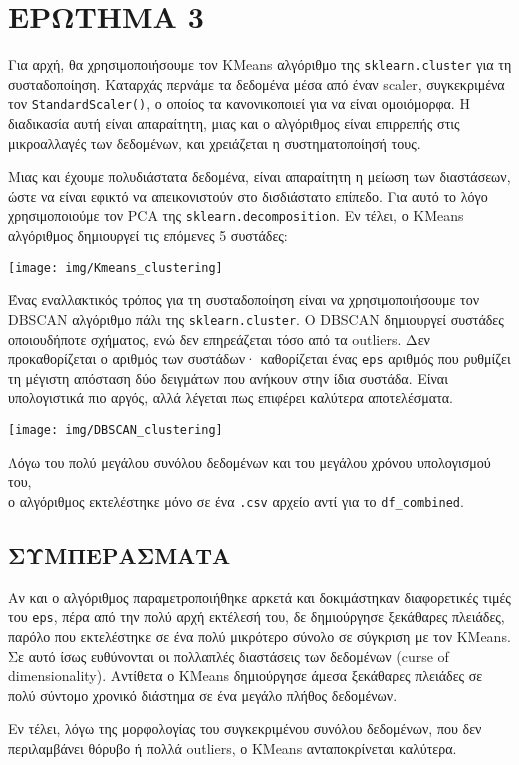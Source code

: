 \pagebreak
\chapter{ΕΡΩΤΗΜΑ 3}

    Για αρχή, θα χρησιμοποιήσουμε τον KMeans αλγόριθμο της \texttt{sklearn.cluster} για τη συσταδοποίηση.
    Καταρχάς περνάμε τα δεδομένα μέσα από έναν scaler, συγκεκριμένα τον \texttt{StandardScaler()}, ο οποίος τα κανονικοποιεί για να είναι ομοιόμορφα.
    Η διαδικασία αυτή είναι απαραίτητη, μιας και ο αλγόριθμος είναι επιρρεπής στις μικροαλλαγές των δεδομένων, και χρειάζεται η συστηματοποίησή τους.

    Μιας και έχουμε πολυδιάστατα δεδομένα, είναι απαραίτητη η μείωση των διαστάσεων, ώστε να είναι εφικτό να απεικονιστούν στο δισδιάστατο επίπεδο.
    Για αυτό το λόγο χρησιμοποιούμε τον PCA της \texttt{sklearn.decomposition}. Εν τέλει, ο KMeans αλγόριθμος δημιουργεί τις επόμενες 5 συστάδες:

    \begin{center}
        \texttt{[image: img/Kmeans\_clustering]}
    \end{center}

    Ένας εναλλακτικός τρόπος για τη συσταδοποίηση είναι να χρησιμοποιήσουμε τον DBSCAN αλγόριθμο πάλι της \texttt{sklearn.cluster}.
    Ο DBSCAN δημιουργεί συστάδες οποιουδήποτε σχήματος, ενώ δεν επηρεάζεται τόσο από τα outliers.
    Δεν προκαθορίζεται ο αριθμός των συστάδων· καθορίζεται ένας \texttt{eps} αριθμός που ρυθμίζει τη μέγιστη απόσταση δύο δειγμάτων που ανήκουν στην ίδια συστάδα.
    Είναι υπολογιστικά πιο αργός, αλλά λέγεται πως επιφέρει καλύτερα αποτελέσματα.

    \begin{center}
        \texttt{[image: img/DBSCAN\_clustering]}
    \end{center}

    \begin{graycomment}
        Λόγω του πολύ μεγάλου συνόλου δεδομένων και του μεγάλου χρόνου υπολογισμού του, \\ο αλγόριθμος εκτελέστηκε μόνο σε ένα \texttt{.csv} αρχείο αντί για το \texttt{df\_combined}.
    \end{graycomment}

    \section{ΣΥΜΠΕΡΑΣΜΑΤΑ}

        Αν και ο αλγόριθμος παραμετροποιήθηκε αρκετά και δοκιμάστηκαν διαφορετικές τιμές του \texttt{eps}, πέρα από την πολύ αρχή εκτέλεσή του,
        δε δημιούργησε ξεκάθαρες πλειάδες, παρόλο που εκτελέστηκε σε ένα πολύ μικρότερο σύνολο σε σύγκριση με τον KMeans. Σε αυτό ίσως ευθύνονται οι πολλαπλές διαστάσεις των δεδομένων (curse of dimensionality).
        Αντίθετα ο KMeans δημιούργησε άμεσα ξεκάθαρες πλειάδες σε πολύ σύντομο χρονικό διάστημα σε ένα μεγάλο πλήθος δεδομένων.

        Εν τέλει, λόγω της μορφολογίας του συγκεκριμένου συνόλου δεδομένων, που δεν περιλαμβάνει θόρυβο ή πολλά outliers, ο KMeans ανταποκρίνεται καλύτερα.